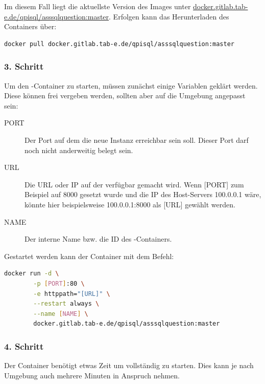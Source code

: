         Im diesem Fall liegt die aktuellste Version des Images unter \url{docker.gitlab.tab-e.de/qpisql/asssqlquestion:master}. Erfolgen kann das Herunterladen des Containers über:
        
        \begin{lstlisting}[language=bash]
        docker pull docker.gitlab.tab-e.de/qpisql/asssqlquestion:master
        \end{lstlisting}
    
    \subsubsection{3. Schritt}
    
        Um den -Container zu starten, müssen zunächst einige Variablen geklärt werden. Diese können frei vergeben werden, sollten aber auf die Umgebung angepasst sein:
        
        \begin{description}
        \item[PORT]
        Der Port auf dem die neue  Instanz erreichbar sein soll. Dieser Port darf noch nicht anderweitig belegt sein.
        \item[URL] 
        Die URL oder IP auf der  verfügbar gemacht wird. Wenn [PORT] zum Beispiel auf 8000 gesetzt wurde und die IP des Host-Servers 100.0.0.1 wäre, könnte hier beispielsweise 100.0.0.1:8000 als [URL] gewählt werden.
        \item[NAME]
        Der interne Name bzw. die ID des -Containers. 
        \end{description}
        
        Gestartet werden kann der Container mit dem Befehl:
        
        \begin{lstlisting}[language=bash]
        docker run -d \
        -p [PORT]:80 \
        -e httppath="[URL]" \
        --restart always \
        --name [NAME] \
        docker.gitlab.tab-e.de/qpisql/asssqlquestion:master
        \end{lstlisting}
    
    \subsubsection{4. Schritt}
    
        Der Container benötigt etwas Zeit um vollständig zu starten. Dies kann je nach Umgebung auch mehrere Minuten in Anspruch nehmen.
    
